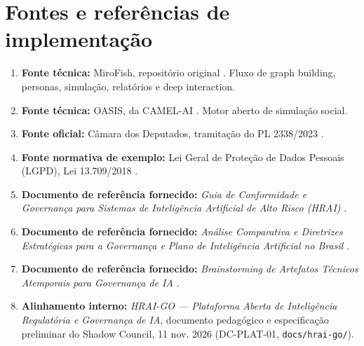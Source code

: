 \documentclass[12pt,a4paper,oneside,english,brazil]{abntex2}
\begin{document}
\section{Fontes e referências de implementação}
\begin{enumerate}
\item \textbf{Fonte técnica:} MiroFish, repositório original \cite{mirofish}. Fluxo de graph building, personas, simulação, relatórios e deep interaction.
\item \textbf{Fonte técnica:} OASIS, da CAMEL-AI \cite{camel-oasis}. Motor aberto de simulação social.
\item \textbf{Fonte oficial:} Câmara dos Deputados, tramitação do PL 2338/2023 \cite{camara-pl2338}.
\item \textbf{Fonte normativa de exemplo:} Lei Geral de Proteção de Dados Pessoais (LGPD), Lei 13.709/2018 \cite{lgpd2018}.
\item \textbf{Documento de referência fornecido:} \emph{Guia de Conformidade e Governança para Sistemas de Inteligência Artificial de Alto Risco (HRAI)} \cite{estudo-guia-hrai}.
\item \textbf{Documento de referência fornecido:} \emph{Análise Comparativa e Diretrizes Estratégicas para a Governança e Plano de Inteligência Artificial no Brasil} \cite{estudo-comparativo}.
\item \textbf{Documento de referência fornecido:} \emph{Brainstorming de Artefatos Técnicos Atemporais para Governança de IA} \cite{estudo-brainstorm}.
\item \textbf{Alinhamento interno:} \emph{HRAI-GO --- Plataforma Aberta de Inteligência Regulatória e Governança de IA}, documento pedagógico e especificação preliminar do Shadow Council, 11 nov. 2026 (DC-PLAT-01, \texttt{docs/hrai-go/}).
\end{enumerate}

\postextual

\end{document}
